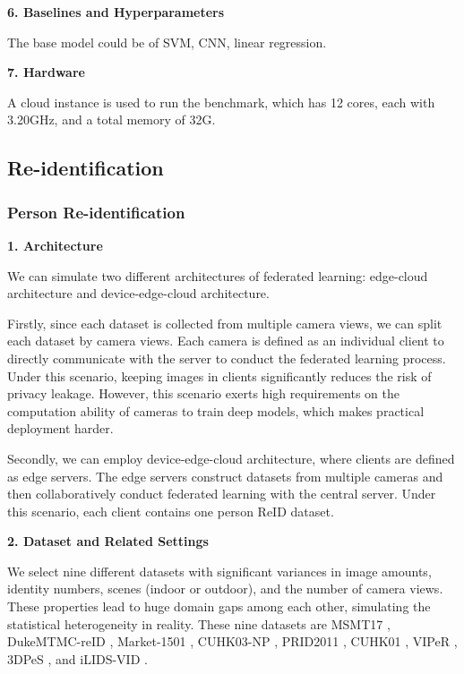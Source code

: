 \noindent
\textbf{6. Baselines and Hyperparameters}

The base model could be of SVM, CNN, linear regression. 

\noindent
\textbf{7. Hardware}

A cloud instance is used to run the benchmark, which has 12 cores, each with 3.20GHz, and a total memory of 32G.








\subsection{Re-identification}

\subsubsection{Person Re-identification}

\noindent
\textbf{1. Architecture}

We can simulate two different architectures of federated learning: edge-cloud architecture and device-edge-cloud architecture. 

Firstly, since each dataset is collected from multiple camera views, we can split each dataset by camera views. Each camera is defined as an individual client to directly communicate with the server to conduct the federated learning process. Under this scenario, keeping images in clients significantly reduces the risk of privacy leakage. However, this scenario exerts high requirements on the computation ability of cameras to train deep models, which makes practical deployment harder. 

Secondly, we can employ device-edge-cloud architecture, where clients are defined as edge servers. The edge servers construct datasets from multiple cameras and then collaboratively conduct federated learning with the central server. Under this scenario, each client contains one person ReID dataset.

\noindent
\textbf{2. Dataset and Related Settings} 

We select nine different datasets with significant variances in image amounts, identity numbers, scenes (indoor or outdoor), and the number of camera views. These properties lead to huge domain gaps among each other, simulating the statistical heterogeneity in reality. These nine datasets are MSMT17 \cite{Wei2017Msmt}, DukeMTMC-reID \cite{zheng2017dukemtmc-reid}, 
Market-1501 \cite{Zheng2015Market1501}, CUHK03-NP \cite{Li2014CUHK03}, PRID2011 \cite{prid2011}, CUHK01 \cite{li2012cuhk01}, VIPeR \cite{Gray2008ViewpointIP}, 3DPeS \cite{3dpes}, and iLIDS-VID \cite{iLIDS-VID}. 

